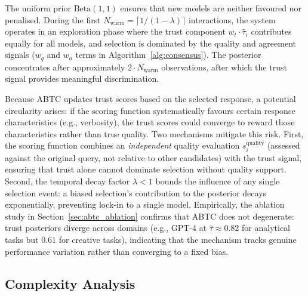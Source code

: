 \documentclass{iopjournal}
\begin{document}
The uniform prior $\text{Beta}(1,1)$ ensures that new models are neither favoured nor penalised. During the first $N_{\text{warm}} = \lceil 1/(1-\lambda) \rceil$ interactions, the system operates in an exploration phase where the trust component $w_t \cdot \hat{\tau}_i$ contributes equally for all models, and selection is dominated by the quality and agreement signals ($w_q$ and $w_a$ terms in Algorithm~\ref{alg:consensus}). The posterior concentrates after approximately $2 \cdot N_{\text{warm}}$ observations, after which the trust signal provides meaningful discrimination.

Because ABTC updates trust scores based on the selected response, a potential circularity arises: if the scoring function systematically favours certain response characteristics (e.g., verbosity), the trust scores could converge to reward those characteristics rather than true quality. Two mechanisms mitigate this risk. First, the scoring function combines an \emph{independent} quality evaluation $s_i^{\text{quality}}$ (assessed against the original query, not relative to other candidates) with the trust signal, ensuring that trust alone cannot dominate selection without quality support. Second, the temporal decay factor $\lambda < 1$ bounds the influence of any single selection event: a biased selection's contribution to the posterior decays exponentially, preventing lock-in to a single model. Empirically, the ablation study in Section~\ref{sec:abtc_ablation} confirms that ABTC does not degenerate: trust posteriors diverge across domains (e.g., GPT-4 at $\hat{\tau} \approx 0.82$ for analytical tasks but $0.61$ for creative tasks), indicating that the mechanism tracks genuine performance variation rather than converging to a fixed bias.

\subsection{Complexity Analysis}
\end{document}

